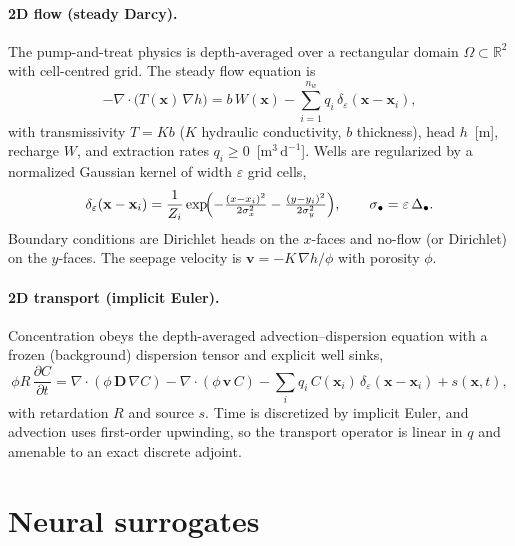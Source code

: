 \documentclass[10pt]{article}
\newcommand{\R}{\mathbb{R}}
\newcommand{\pdd}[2]{\frac{\partial #1}{\partial #2}}
\begin{document}
\paragraph{2D flow (steady Darcy).}
The pump-and-treat physics is depth-averaged over a rectangular domain
$\Omega\subset\R^2$ with cell-centred grid. The steady flow equation is
\begin{equation}
-\nabla\cdot\bigl(T(\mathbf{x})\,\nabla h\bigr)
= b\,W(\mathbf{x})-\sum_{i=1}^{n_w} q_i\,\delta_\varepsilon(\mathbf{x}-\mathbf{x}_i),
\label{eq:darcy}
\end{equation}
with transmissivity $T=K b$ ($K$ hydraulic conductivity, $b$ thickness), head
$h$~[m], recharge $W$, and extraction rates $q_i\ge0$~[$\mathrm{m^3\,d^{-1}}$].
Wells are regularized by a normalized Gaussian kernel of width $\varepsilon$
grid cells,
\begin{equation}
\delta_\varepsilon(\mathbf{x}-\mathbf{x}_i)=\frac1{Z_i}
\exp\!\Bigl(-\tfrac{(x-x_i)^2}{2\sigma_x^2}-\tfrac{(y-y_i)^2}{2\sigma_y^2}\Bigr),
\qquad \sigma_\bullet=\varepsilon\,\Delta_\bullet .
\label{eq:well}
\end{equation}
Boundary conditions are Dirichlet heads on the $x$-faces and no-flow (or
Dirichlet) on the $y$-faces. The seepage velocity is
$\mathbf{v}=-K\,\nabla h/\phi$ with porosity $\phi$.

\paragraph{2D transport (implicit Euler).}
Concentration obeys the depth-averaged advection--dispersion equation with a
frozen (background) dispersion tensor and explicit well sinks,
\begin{equation}
\phi R\,\pdd{C}{t}
=\nabla\cdot(\phi\,\mathbf{D}\,\nabla C)
-\nabla\cdot(\phi\,\mathbf{v}\,C)
-\sum_i q_i\,C(\mathbf{x}_i)\,\delta_\varepsilon(\mathbf{x}-\mathbf{x}_i)
+s(\mathbf{x},t),
\label{eq:transport}
\end{equation}
with retardation $R$ and source $s$. Time is discretized by implicit Euler,
and advection uses first-order upwinding, so the transport operator is linear
in $q$ and amenable to an exact discrete adjoint.

\section{Neural surrogates}
\label{sec:surrogates}
\end{document}
